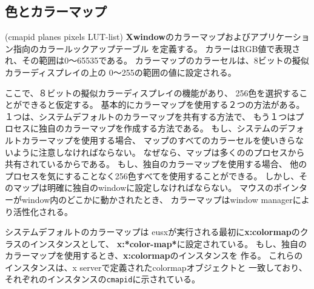 \begin{refdesc}



\end{refdesc}

\subsection{色とカラーマップ}

\begin{refdesc}
{(cmapid planes pixels LUT-list)}{
{\bf Xwindow}のカラーマップおよびアプリケーション指向のカラールックアップテーブル
を定義する。
カラーはRGB値で表現され、その範囲は0〜65535である。
カラーマップのカラーセルは、8ビットの擬似カラーディスプレイの上の
0〜255の範囲の値に設定される。}
\end{refdesc}

ここで、８ビットの擬似カラーディスプレイの機能があり、
256色を選択することができると仮定する。
基本的にカラーマップを使用する２つの方法がある。
１つは、システムデフォルトのカラーマップを共有する方法で、
もう１つはプロセスに独自のカラーマップを作成する方法である。
もし、システムのデフォルトカラーマップを使用する場合、
マップのすべてのカラーセルを使いきらないように注意しなければならない。
なぜなら、マップは多くののプロセスから共有されているからである。
もし、独自のカラーマップを使用する場合、
他のプロセスを気にすることなく256色すべてを使用することができる。
しかし、そのマップは明確に独自のwindowに設定しなければならない。
マウスのポインターがwindow内のどこかに動かされたとき、
カラーマップはwindow managerにより活性化される。

システムデフォルトのカラーマップは
eusxが実行される最初に{\bf x:colormap}のクラスのインスタンスとして、
{\bf x:*color-map*}に設定されている。
もし、独自のカラーマップを使用するとき、{\bf x:colormap}のインスタンスを
作る。
これらのインスタンスは、x serverで定義されたcolormapオブジェクトと
一致しており、それぞれのインスタンスの{\tt cmapid}に示されている。

